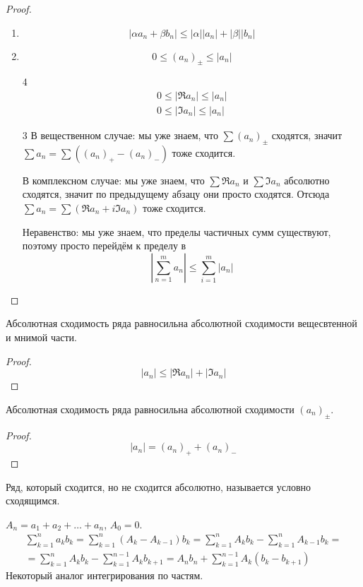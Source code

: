 \begin{proof}
	\begin{enumerate}
	\item
		\[ |\alpha a_n + \beta b_n| \le |\alpha| |a_n| + |\beta| |b_n| \]

	\item
		\[ 0 \le (a_n)_\pm \le |a_n| \]

	\item[4]
		\begin{gather*}
			0 \le |\Re a_n| \le |a_n| \\
			0 \le |\Im a_n| \le |a_n|
		\end{gather*}

	\item[3]
		В вещественном случае: мы уже знаем, что $\sum (a_n)_\pm$ сходятся, значит $\sum a_n = \sum \left((a_n)_+ - (a_n)_-\right)$ тоже сходится.

		В комплексном случае: мы уже знаем, что $\sum \Re a_n$ и $\sum \Im a_n$ абсолютно сходятся, значит по предыдущему абзацу они просто сходятся.
		Отсюда $\sum a_n = \sum (\Re a_n + i \Im a_n)$ тоже сходится.

		Неравенство: мы уже знаем, что пределы частичных сумм существуют, поэтому просто перейдём к пределу в
		\[ \left| \sum_{n=1}^m a_n \right| \le \sum_{i=1}^m |a_n|\]
	\end{enumerate}
\end{proof}

\begin{Rem}
	Абсолютная сходимость ряда равносильна абсолютной сходимости вещесвтенной и мнимой части.
\end{Rem}
\begin{proof}
	\[ |a_n| \le |\Re a_n| + |\Im a_n| \]
\end{proof}

\begin{Rem}
	Абсолютная сходимость ряда равносильна абсолютной сходимости $(a_n)_\pm$.
\end{Rem}
\begin{proof}
	\[ |a_n| = (a_n)_+ + (a_n)_- \]
\end{proof}

\begin{Def}
	Ряд, который сходится, но не сходится абсолютно, называется условно сходящимся.
\end{Def}

\begin{theorem}
	$A_n = a_1 + a_2 + \dots + a_n$, $A_0 = 0$.
	\begin{gather*}
		\sum_{k=1}^n a_k b_k = \sum_{k=1}^n (A_k - A_{k-1})b_k = \sum_{k=1}^n A_kb_k - \sum_{k=1}^n A_{k-1}b_k = \\
		= \sum_{k=1}^n A_kb_k - \sum_{k=1}^{n-1} A_kb_{k+1} = A_nb_n + \sum_{k=1}^{n-1} A_k (b_k - b_{k+1})
	\end{gather*}
	Некоторый аналог интегрирования по частям.
\end{theorem}

